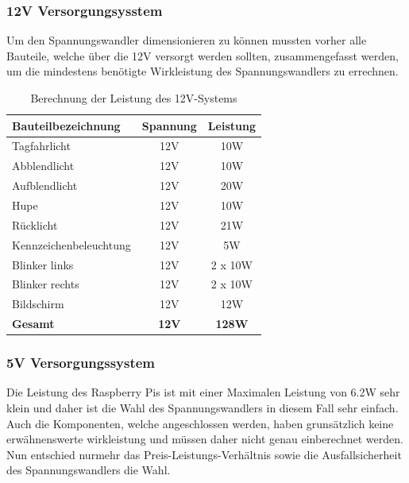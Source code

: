 \subsubsection{12V Versorgungsysstem}
Um den Spannungswandler dimensionieren zu können mussten vorher alle Bauteile, welche über die 12V versorgt werden sollten, zusammengefasst werden, um die mindestens benötigte Wirkleistung des Spannungswandlers zu errechnen. 
\begin{table}[H]
\begin{center}
\begin{tabular}{|l|c|c|}
\hline
\textbf{Bauteilbezeichnung}     & \textbf{Spannung} & \textbf{Leistung} \\ \hline
Tagfahrlicht           & 12V      & 10W      \\ \hline
Abblendlicht           & 12V      & 10W      \\ \hline
Aufblendlicht          & 12V      & 20W      \\ \hline
Hupe                   & 12V      & 10W      \\ \hline
Rücklicht              & 12V      & 21W      \\ \hline
Kennzeichenbeleuchtung & 12V      & 5W       \\ \hline
Blinker links          & 12V      & 2 x 10W  \\ \hline
Blinker rechts         & 12V      & 2 x 10W  \\ \hline
Bildschirm             & 12V      & 12W      \\ \hline
\textbf{Gesamt}                 & \textbf{12V}      & \textbf{128W}     \\ \hline
\end{tabular}
\caption{Berechnung der Leistung des 12V-Systems}
\label{tab:leistung12V}
\end{center}
\end{table}

\subsubsection{5V Versorgungssystem}

Die Leistung des Raspberry Pis ist mit einer Maximalen Leistung von 6.2W sehr klein und daher ist die Wahl des Spannungswandlers in diesem Fall sehr einfach. Auch die Komponenten, welche angeschlossen werden, haben grunsätzlich keine erwähnenswerte wirkleistung und müssen daher nicht genau einberechnet werden. Nun entschied nurmehr das Preis-Leistungs-Verhältnis sowie die Ausfallsicherheit des Spannungswandlers die Wahl.

